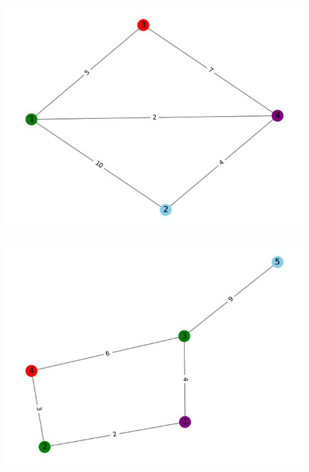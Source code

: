 \documentclass{article}
\begin{document}
\begin{figure}
    \centering
    \includegraphics[width=1\linewidth]{4.jpg}
    \label{fig:enter-label}
\end{figure}

\begin{figure}
    \centering
    \includegraphics[width=1\linewidth]{5.jpg}
    \label{fig:enter-label}
\end{figure}
\end{document}
